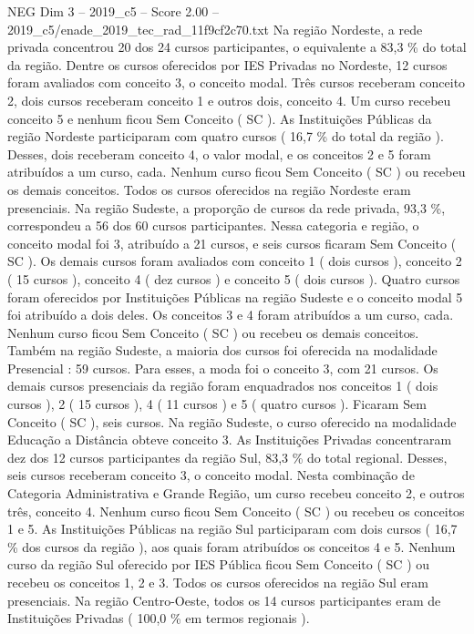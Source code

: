 \begin{textsample}{NEG Dim 3 – 2019\_c5 – Score 2.00 – 2019\_c5/enade\_2019\_tec\_rad\_11f9cf2c70.txt}
Na região Nordeste, a rede privada concentrou 20 dos 24 cursos participantes, o equivalente a 83,3 \% do total da região.
Dentre os cursos oferecidos por IES Privadas no Nordeste, 12 cursos foram avaliados com conceito 3, o conceito modal.
Três cursos receberam conceito 2, dois cursos receberam conceito 1 e outros dois, conceito 4.
Um curso recebeu conceito 5 e nenhum ficou Sem Conceito ( SC ).
As Instituições Públicas da região Nordeste participaram com quatro cursos ( 16,7 \% do total da região ).
Desses, dois receberam conceito 4, o valor modal, e os conceitos 2 e 5 foram atribuídos a um curso, cada.
Nenhum curso ficou Sem Conceito ( SC ) ou recebeu os demais conceitos.
Todos os cursos oferecidos na região Nordeste eram presenciais.
Na região Sudeste, a proporção de cursos da rede privada, 93,3 \%, correspondeu a 56 dos 60 cursos participantes.
Nessa categoria e região, o conceito modal foi 3, atribuído a 21 cursos, e seis cursos ficaram Sem Conceito ( SC ).
Os demais cursos foram avaliados com conceito 1 ( dois cursos ), conceito 2 ( 15 cursos ), conceito 4 ( dez cursos ) e conceito 5 ( dois cursos ).
Quatro cursos foram oferecidos por Instituições Públicas na região Sudeste e o conceito modal 5 foi atribuído a dois deles.
Os conceitos 3 e 4 foram atribuídos a um curso, cada.
Nenhum curso ficou Sem Conceito ( SC ) ou recebeu os demais conceitos.
Também na região Sudeste, a maioria dos cursos foi oferecida na modalidade Presencial : 59 cursos.
Para esses, a moda foi o conceito 3, com 21 cursos.
Os demais cursos presenciais da região foram enquadrados nos conceitos 1 ( dois cursos ), 2 ( 15 cursos ), 4 ( 11 cursos ) e 5 ( quatro cursos ).
Ficaram Sem Conceito ( SC ), seis cursos.
Na região Sudeste, o curso oferecido na modalidade Educação a Distância obteve conceito 3.
As Instituições Privadas concentraram dez dos 12 cursos participantes da região Sul, 83,3 \% do total regional.
Desses, seis cursos receberam conceito 3, o conceito modal.
Nesta combinação de Categoria Administrativa e Grande Região, um curso recebeu conceito 2, e outros três, conceito 4.
Nenhum curso ficou Sem Conceito ( SC ) ou recebeu os conceitos 1 e 5.
As Instituições Públicas na região Sul participaram com dois cursos ( 16,7 \% dos cursos da região ), aos quais foram atribuídos os conceitos 4 e 5.
Nenhum curso da região Sul oferecido por IES Pública ficou Sem Conceito ( SC ) ou recebeu os conceitos 1, 2 e 3.
Todos os cursos oferecidos na região Sul eram presenciais.
Na região Centro-Oeste, todos os 14 cursos participantes eram de Instituições Privadas ( 100,0 \% em termos regionais ).

\end{textsample}
